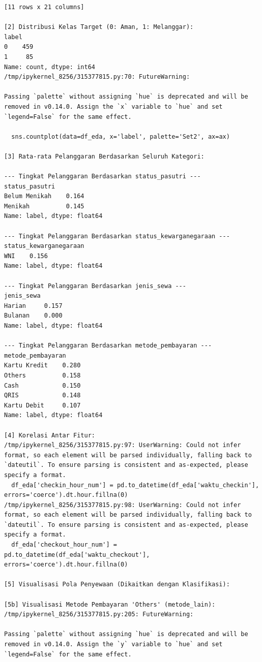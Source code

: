 \begin{lstlisting}[caption={Output 22}]
[11 rows x 21 columns]

[2] Distribusi Kelas Target (0: Aman, 1: Melanggar):
label
0    459
1     85
Name: count, dtype: int64
/tmp/ipykernel_8256/315377815.py:70: FutureWarning: 

Passing `palette` without assigning `hue` is deprecated and will be removed in v0.14.0. Assign the `x` variable to `hue` and set `legend=False` for the same effect.

  sns.countplot(data=df_eda, x='label', palette='Set2', ax=ax)

[3] Rata-rata Pelanggaran Berdasarkan Seluruh Kategori:

--- Tingkat Pelanggaran Berdasarkan status_pasutri ---
status_pasutri
Belum Menikah    0.164
Menikah          0.145
Name: label, dtype: float64

--- Tingkat Pelanggaran Berdasarkan status_kewarganegaraan ---
status_kewarganegaraan
WNI    0.156
Name: label, dtype: float64

--- Tingkat Pelanggaran Berdasarkan jenis_sewa ---
jenis_sewa
Harian     0.157
Bulanan    0.000
Name: label, dtype: float64

--- Tingkat Pelanggaran Berdasarkan metode_pembayaran ---
metode_pembayaran
Kartu Kredit    0.280
Others          0.158
Cash            0.150
QRIS            0.148
Kartu Debit     0.107
Name: label, dtype: float64

[4] Korelasi Antar Fitur:
/tmp/ipykernel_8256/315377815.py:97: UserWarning: Could not infer format, so each element will be parsed individually, falling back to `dateutil`. To ensure parsing is consistent and as-expected, please specify a format.
  df_eda['checkin_hour_num'] = pd.to_datetime(df_eda['waktu_checkin'], errors='coerce').dt.hour.fillna(0)
/tmp/ipykernel_8256/315377815.py:98: UserWarning: Could not infer format, so each element will be parsed individually, falling back to `dateutil`. To ensure parsing is consistent and as-expected, please specify a format.
  df_eda['checkout_hour_num'] = pd.to_datetime(df_eda['waktu_checkout'], errors='coerce').dt.hour.fillna(0)

[5] Visualisasi Pola Penyewaan (Dikaitkan dengan Klasifikasi):

[5b] Visualisasi Metode Pembayaran 'Others' (metode_lain):
/tmp/ipykernel_8256/315377815.py:205: FutureWarning: 

Passing `palette` without assigning `hue` is deprecated and will be removed in v0.14.0. Assign the `y` variable to `hue` and set `legend=False` for the same effect.


\end{lstlisting}

